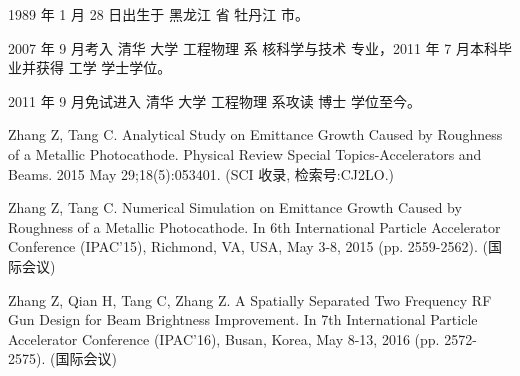 \begin{resume}


  1989 年 1 月 28 日出生于 黑龙江 省 牡丹江 市。

  2007 年 9 月考入 清华 大学 工程物理 系 核科学与技术 专业，2011 年 7 月本科毕业并获得 工学 学士学位。

  2011 年 9 月免试进入 清华 大学 工程物理 系攻读 博士 学位至今。


  \begin{publications}
    \item Zhang Z, Tang C. Analytical Study on Emittance Growth Caused by Roughness of a Metallic Photocathode. Physical Review Special Topics-Accelerators and Beams. 2015 May 29;18(5):053401. (SCI 收录, 检索号:CJ2LO.)
    \item Zhang Z, Tang C. Numerical Simulation on Emittance Growth Caused by Roughness of a Metallic Photocathode. In 6th International Particle Accelerator Conference (IPAC'15), Richmond, VA, USA, May 3-8, 2015 (pp. 2559-2562). (国际会议)
    \item Zhang Z, Qian H, Tang C, Zhang Z. A Spatially Separated Two Frequency RF Gun Design for Beam Brightness Improvement. In 7th International Particle Accelerator Conference (IPAC'16), Busan, Korea, May 8-13, 2016 (pp. 2572-2575). (国际会议)
  \end{publications}




\end{resume}
